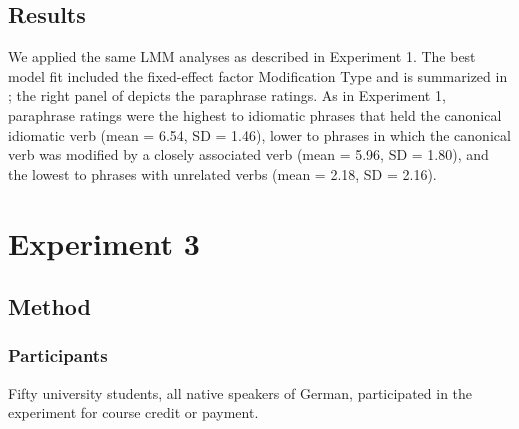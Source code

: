 \documentclass[output=paper]{langsci/langscibook}
\begin{document}
\subsection{Results}
We applied the same LMM analyses as described in Experiment 1. The best model fit included the fixed-effect factor Modification Type and is summarized in ; the right panel of  depicts the paraphrase ratings. As in Experiment 1, paraphrase ratings were the highest to idiomatic phrases that held the canonical idiomatic verb (mean = 6.54, SD = 1.46), lower to phrases in which the canonical verb was modified by a closely associated verb (mean = 5.96, SD = 1.80), and the lowest to phrases with unrelated verbs (mean = 2.18, SD = 2.16). 

\begin{table}
\caption{Fixed effects of the predictors in the linear mixed-effect model for the paraphrase ratings in Experiment 2. \textit{Notes:} significance code: *** < 0.0001, ** < 0.01.\label{tab:Table5}}
\end{table}

\section{Experiment 3}
\subsection{Method}
\subsubsection{Participants}

Fifty university students, all native speakers of German, participated in the experiment for course credit or payment.
\end{document}
